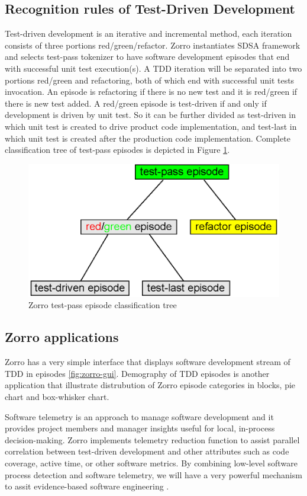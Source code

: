 \subsection{Recognition rules of Test-Driven Development}
Test-driven development is an iterative and incremental method, each
iteration consists of three portions red/green/refactor. Zorro instantiates
SDSA framework and selects test-pass tokenizer to have software development
episodes that end with successful unit test execution(s). A TDD iteration
will be separated into two portions red/green and refactoring, both of
which end with successful unit tests invocation. An episode is refactoring
if there is no new test and it is red/green if there is new test added. A
red/green episode is test-driven if and only if development is driven by
unit test.  So it can be further divided as test-driven in which unit test
is created to drive product code implementation, and test-last in which
unit test is created after the production code implementation. Complete
classification tree of test-pass episodes is depicted in Figure
\ref{fig:EpisodeTree}.
\begin{figure}[htbp] 
  \centering
  \includegraphics{figs/EpisodeClassficationTree.eps}
  \caption{Zorro test-pass episode classification tree}\label{fig:EpisodeTree}
\end{figure} 

\subsection{Zorro applications}
Zorro has a very simple interface that displays software development stream
of TDD in episodes \ref{fig:zorro-gui}. Demography of TDD episodes is
another application that illustrate distrubution of Zorro episode
categories in blocks, pie chart and box-whisker chart. 

Software telemetry\cite{csdl2-04-11} is an approach to manage software
development and it provides project members and manager insights useful for
local, in-process decision-making. Zorro implements telemetry reduction
function to assist parallel correlation between test-driven development and
other attributes such as code coverage, active time, or other software
metrics. By combining low-level software process detection and software
telemetry, we will have a very powerful mechanism to assit evidence-based
software engineering \cite{Kitchenham:04}.

